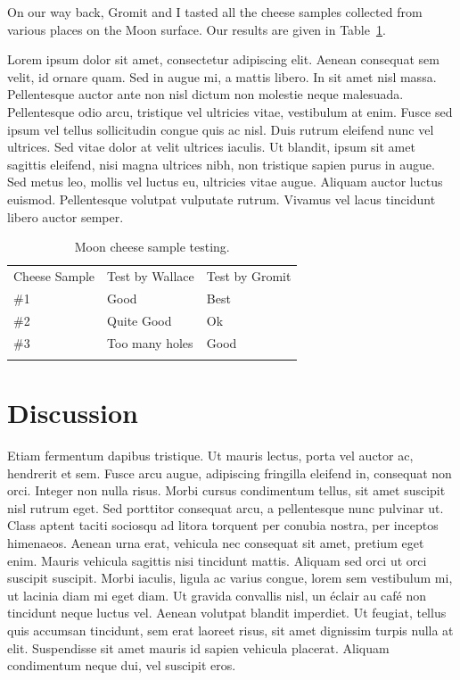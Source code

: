 \documentclass[final,12pt]{article}
\begin{document}
On our way back, Gromit and I tasted all the cheese samples collected
from various places on the Moon surface. Our results are given in
Table~\ref{tab:results}. 

Lorem ipsum dolor sit amet, consectetur adipiscing elit. Aenean
consequat sem velit, id ornare quam. Sed in augue mi, a mattis
libero. In sit amet nisl massa. Pellentesque auctor ante non nisl
dictum non molestie neque malesuada. Pellentesque odio arcu, tristique
vel ultricies vitae, vestibulum at enim. Fusce sed ipsum vel tellus
sollicitudin congue quis ac nisl. Duis rutrum eleifend nunc vel
ultrices. Sed vitae dolor at velit ultrices iaculis. Ut blandit, ipsum
sit amet sagittis eleifend, nisi magna ultrices nibh, non tristique
sapien purus in augue. Sed metus leo, mollis vel luctus eu, ultricies
vitae augue. Aliquam auctor luctus euismod. Pellentesque volutpat
vulputate rutrum. Vivamus vel lacus tincidunt libero auctor semper.

\begin{table}[h]
\begin{center}
\begin{tabular}{l|ll}
\hline
\noalign{\smallskip}
Cheese Sample & Test by Wallace &  Test by Gromit \\
\noalign{\smallskip}
\hline
\noalign{\smallskip}
\#1 & Good           & Best \\
\#2 & Quite Good     & Ok \\ 
\#3 & Too many holes & Good \\ 
\noalign{\smallskip}
\hline
\end{tabular}
\caption{Moon cheese sample testing.}\label{tab:results}   %
\end{center}
\end{table}


\section{Discussion}

Etiam fermentum dapibus tristique. Ut mauris lectus, porta vel auctor
ac, hendrerit et sem. Fusce arcu augue, adipiscing fringilla eleifend
in, consequat non orci. Integer non nulla risus. Morbi cursus
condimentum tellus, sit amet suscipit nisl rutrum eget. Sed porttitor
consequat arcu, a pellentesque nunc pulvinar ut. Class aptent taciti
sociosqu ad litora torquent per conubia nostra, per inceptos
himenaeos. Aenean urna erat, vehicula nec consequat sit amet, pretium
eget enim. Mauris vehicula sagittis nisi tincidunt mattis. Aliquam sed
orci ut orci suscipit suscipit. Morbi iaculis, ligula ac varius
congue, lorem sem vestibulum mi, ut lacinia diam mi eget diam. Ut
gravida convallis nisl, un éclair au café non tincidunt neque luctus vel. Aenean
volutpat blandit imperdiet. Ut feugiat, tellus quis accumsan
tincidunt, sem erat laoreet risus, sit amet dignissim turpis nulla at
elit. Suspendisse sit amet mauris id sapien vehicula placerat. Aliquam
condimentum neque dui, vel suscipit eros.
\end{document}
